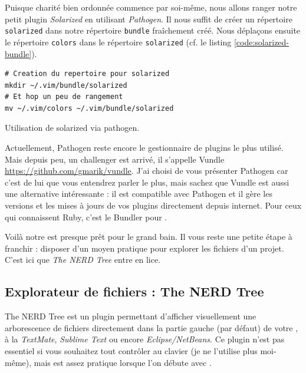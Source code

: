 Puisque charité bien ordonnée commence par soi-même, nous allons ranger notre petit plugin \emph{Solarized} en utilisant \emph{Pathogen}. Il nous suffit de créer un répertoire \Verb|solarized| dans notre répertoire \Verb|bundle| fraîchement créé. Nous déplaçons ensuite le répertoire \Verb|colors| dans le répertoire \Verb|solarized| (cf. le listing \ref{code:solarized-bundle}).

\begin{listing}[H]
\begin{verbatim}
# Creation du repertoire pour solarized
mkdir ~/.vim/bundle/solarized
# Et hop un peu de rangement
mv ~/.vim/colors ~/.vim/bundle/solarized
\end{verbatim}
  \caption{Utilisation de solarized via pathogen.}
  \label{code:solarized-bundle}
\end{listing}

Actuellement, Pathogen reste encore le gestionnaire de plugins \vim le plus utilisé. Mais depuis peu, un challenger est arrivé, il s'appelle Vundle \url{https://github.com/gmarik/vundle}. J'ai choisi de vous présenter Pathogen car c'est de lui que vous entendrez parler le plus, mais sachez que Vundle est aussi une alternative intéressante : il est compatible avec Pathogen et il gère les versions et les mises à jours de vos plugins directement depuis internet. Pour ceux qui connaissent Ruby, c'est le Bundler  pour \vim.


Voilà notre \vim est presque prêt pour le grand bain. Il vous reste une petite étape à franchir : disposer d'un moyen pratique pour explorer les fichiers d'un projet. C'est ici que \emph{The NERD Tree} entre en lice.

\subsection{Explorateur de fichiers : The NERD Tree}
\label{ssec:nerdtree}
The NERD Tree est un plugin permettant d'afficher visuellement une arborescence de fichiers directement dans la partie gauche (par défaut) de votre \vim, à la \emph{TextMate}, \emph{Sublime Text} ou encore \emph{Eclipse/NetBeans}. Ce plugin n'est pas essentiel si vous souhaitez tout contrôler au clavier (je ne l'utilise plus moi-même), mais est assez pratique lorsque l'on débute avec \vim.

